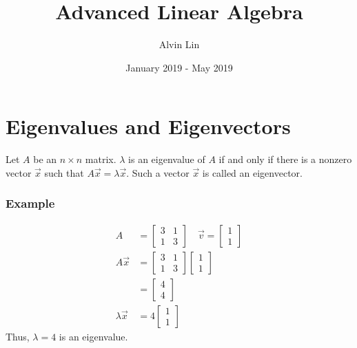 \documentclass{math}
\title{Advanced Linear Algebra}
\author{Alvin Lin}
\date{January 2019 - May 2019}
\begin{document}
\maketitle

\section*{Eigenvalues and Eigenvectors}
Let \( A \) be an \( n\times n \) matrix. \( \lambda \) is an eigenvalue of
\( A \) if and only if there is a nonzero vector \( \vec{x} \) such that
\( A\vec{x} = \lambda\vec{x} \). Such a vector \( \vec{x} \) is called an
eigenvector.

\subsubsection*{Example}
\begin{align*}
  A &= \begin{bmatrix}
    3 & 1 \\
    1 & 3
  \end{bmatrix} \quad \vec{v} = \begin{bmatrix}1 \\ 1\end{bmatrix} \\
  A\vec{x} &= \begin{bmatrix}
    3 & 1 \\
    1 & 3
  \end{bmatrix}\begin{bmatrix}
    1 \\ 1
  \end{bmatrix} \\
  &= \begin{bmatrix}
    4 \\ 4
  \end{bmatrix} \\
  \lambda\vec{x} &= 4\begin{bmatrix}1 \\ 1\end{bmatrix}
\end{align*}
Thus, \( \lambda = 4 \) is an eigenvalue.
\end{document}
